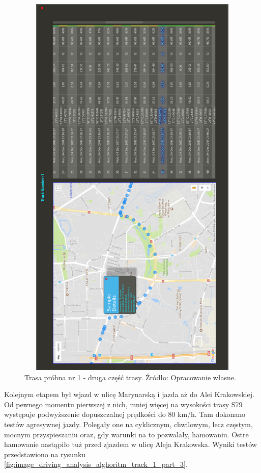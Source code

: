 \begin{figure}[H]
	\centering
	\includegraphics[height=19cm, width=13cm]{img/driving_analysis/test_track_part_2.png}
	\caption{Trasa próbna nr 1 - druga część trasy. Źródło: Opracowanie własne.}
	\label{fig:image_driving_analysis_alghoritm_track_1_part_2}
\end{figure}

Kolejnym etapem był wjazd w ulicę Marynarską i jazda aż do Alei Krakowskiej. Od pewnego momentu pierwszej z nich, mniej więcej na wysokości trasy S79 występuje podwyższenie dopuszczalnej prędkości do 80 km/h. Tam dokonano testów agresywnej jazdy. Polegały one na cyklicznym, chwilowym, lecz częstym, mocnym przyspieszaniu oraz, gdy warunki na to pozwalały, hamowaniu. Ostre hamowanie nastąpiło tuż przed zjazdem w ulicę Aleja Krakowska. Wyniki testów przedstawiono na rysunku \ref{fig:image_driving_analysis_alghoritm_track_1_part_3}.

